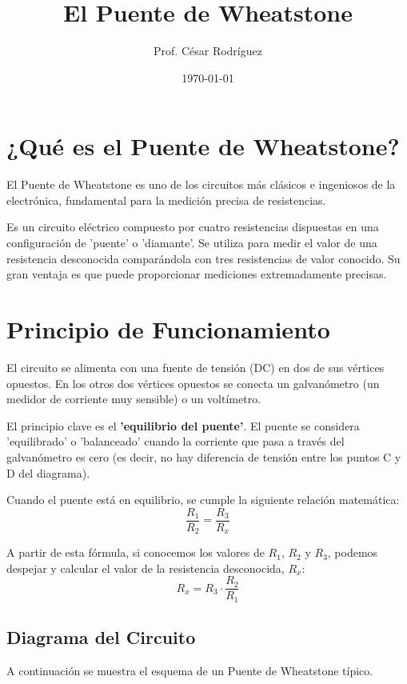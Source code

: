 \documentclass{article}
\title{El Puente de Wheatstone}
\author{Prof. César Rodríguez}
\date{\today}
\begin{document}
\maketitle

\section{¿Qué es el Puente de Wheatstone?}

El Puente de Wheatstone es uno de los circuitos más clásicos e ingeniosos de la electrónica, fundamental para la medición precisa de resistencias.

Es un circuito eléctrico compuesto por cuatro resistencias dispuestas en una configuración de 'puente' o 'diamante'. Se utiliza para medir el valor de una resistencia desconocida comparándola con tres resistencias de valor conocido. Su gran ventaja es que puede proporcionar mediciones extremadamente precisas.

\section{Principio de Funcionamiento}

El circuito se alimenta con una fuente de tensión (DC) en dos de sus vértices opuestos. En los otros dos vértices opuestos se conecta un galvanómetro (un medidor de corriente muy sensible) o un voltímetro.

El principio clave es el \textbf{'equilibrio del puente'}. El puente se considera 'equilibrado' o 'balanceado' cuando la corriente que pasa a través del galvanómetro es cero (es decir, no hay diferencia de tensión entre los puntos C y D del diagrama).

Cuando el puente está en equilibrio, se cumple la siguiente relación matemática:
\[
\frac{R_1}{R_2} = \frac{R_3}{R_x}
\]

A partir de esta fórmula, si conocemos los valores de $R_1$, $R_2$ y $R_3$, podemos despejar y calcular el valor de la resistencia desconocida, $R_x$:
\[
R_x = R_3 \cdot \frac{R_2}{R_1}
\]

\subsection{Diagrama del Circuito}

A continuación se muestra el esquema de un Puente de Wheatstone típico.
\end{document}
